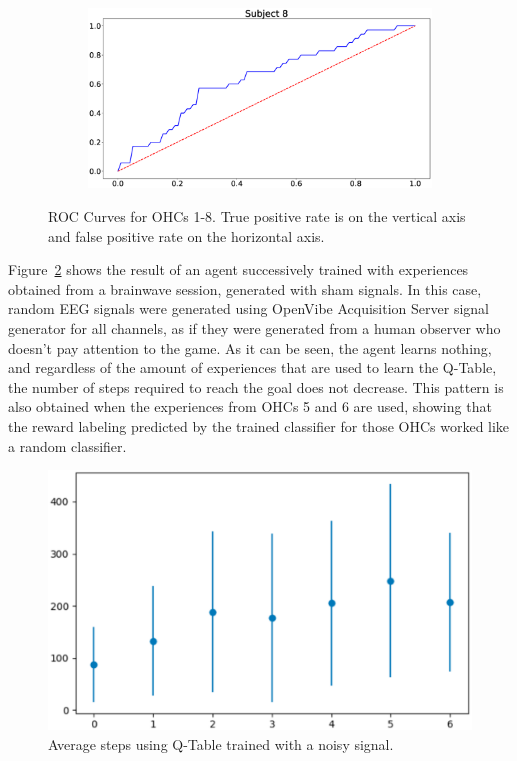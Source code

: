 \documentclass[journal]{IEEEtran}
\begin{document}
{{\begin{figure}[h!]
\begin{subfigure}{0.5\textwidth}
  \includegraphics[scale=0.09]{revisedimages/roc_8.eps} \\
\end{subfigure}
\caption{ROC Curves for OHCs 1-8. True positive rate is on the vertical axis and false positive rate on the horizontal axis.}
\label{fig:rocsubjects}
\end{figure}


Figure~\ref{fig:avg_steps_noise} shows the result of an agent successively trained with experiences obtained from a brainwave session, generated with sham signals.  In this case, random EEG signals were generated using OpenVibe Acquisition Server signal generator for all channels, as if they were generated from a human observer who doesn't pay attention to the game.  As it can be seen, the agent learns nothing, and regardless of the amount of experiences that are used to learn the Q-Table, the number of steps required to reach the goal does not decrease.  This pattern is also obtained when the experiences from OHCs 5 and 6 are used, showing that the reward labeling predicted by the trained classifier for those OHCs worked like a random classifier.

\begin{figure}[h!]
\centering
\includegraphics[scale=0.4]{Images/Average_steps/noise.eps}
\caption{Average steps using Q-Table trained with a noisy signal.}
\label{fig:avg_steps_noise}
\end{figure}

}}
\end{document}
